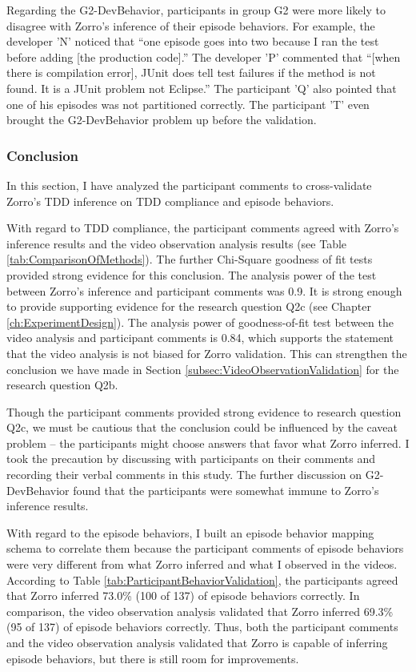 Regarding the G2-DevBehavior, participants in group G2 were more likely to
disagree with Zorro's inference of their episode behaviors. For example, 
the developer 'N' noticed that ``one episode goes into two because I ran 
the test before adding [the production code].'' The
developer 'P' commented that ``[when there is compilation error], JUnit
does tell test failures if the method is not found. It is a JUnit
problem not Eclipse.'' The participant 'Q' also pointed that one of his
episodes was not partitioned correctly. The participant 'T' even brought
the G2-DevBehavior problem up before the validation. 

\subsubsection{Conclusion}
In this section, I have analyzed the participant comments to cross-validate 
Zorro's TDD inference on TDD compliance and episode behaviors. 

With regard to TDD compliance, the participant comments agreed with Zorro's
inference results and the video observation analysis results (see Table \ref{tab:ComparisonOfMethods}). The further Chi-Square goodness of fit tests
provided strong evidence for this conclusion. The analysis power of the
test between Zorro's inference and participant comments was 0.9. It
is strong enough to provide supporting evidence for the research question
Q2c (see Chapter \ref{ch:ExperimentDesign}).
The analysis power of goodness-of-fit test between the video analysis and
participant comments is 0.84, which supports the statement that the video 
analysis is not biased for Zorro validation. This can strengthen the conclusion
we have made in Section \ref{subsec:VideoObservationValidation} for the research 
question Q2b.

Though the participant comments provided strong evidence to research question 
Q2c, we must be cautious that the conclusion could be influenced by the 
caveat problem -- the participants might choose answers that favor what
Zorro inferred. I took the precaution by discussing with participants on
their comments and recording their verbal comments in this study. The further
discussion on G2-DevBehavior found that the participants were 
somewhat immune to Zorro's inference results.  

With regard to the episode behaviors, I built an episode behavior 
mapping schema to correlate them because the participant comments 
of episode behaviors were very different from what Zorro inferred 
and what I observed in the videos. According to 
Table \ref{tab:ParticipantBehaviorValidation}, the participants agreed that 
Zorro inferred 73.0\% (100 of 137) of episode behaviors correctly. In 
comparison, the video observation analysis validated that Zorro inferred
 69.3\% (95 of 137) of episode behaviors correctly. Thus, both the participant
comments and the video observation analysis validated that Zorro is capable
of inferring episode behaviors, but there is still room for improvements.

